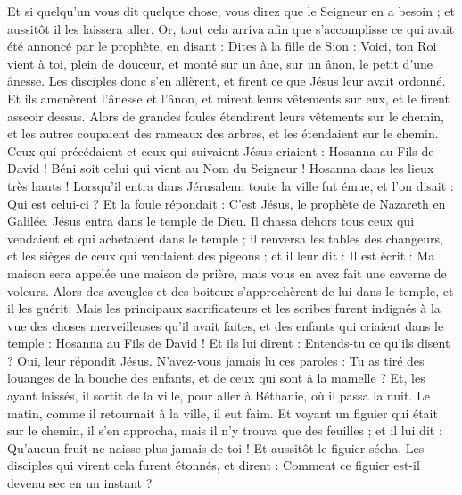 \begin{multicols}{2}
Et si quelqu'un vous dit quelque chose, vous direz que le Seigneur en a besoin ; et aussitôt il les laissera aller.
Or, tout cela arriva afin que s’accomplisse ce qui avait été annoncé par le prophète, en disant :
Dites à la fille de Sion : Voici, ton Roi vient à toi, plein de douceur, et monté sur un âne, sur un ânon, le petit d'une ânesse{}.
Les disciples donc s'en allèrent, et firent ce que Jésus leur avait ordonné.
Et ils amenèrent l'ânesse et l'ânon, et mirent leurs vêtements sur eux, et le firent asseoir dessus.
Alors de grandes foules étendirent leurs vêtements sur le chemin, et les autres coupaient des rameaux des arbres, et les étendaient sur le chemin.
Ceux qui précédaient et ceux qui suivaient Jésus criaient : Hosanna au Fils de David ! Béni soit celui qui vient au Nom du Seigneur ! Hosanna dans les lieux très hauts !
Lorsqu’il entra dans Jérusalem, toute la ville fut émue, et l’on disait : Qui est celui-ci ?
Et la foule répondait : C’est Jésus, le prophète de Nazareth en Galilée.
Jésus entra dans le temple de Dieu. Il chassa dehors tous ceux qui vendaient et qui achetaient dans le temple ; il renversa les tables des changeurs, et les sièges de ceux qui vendaient des pigeons ;
et il leur dit : Il est écrit : Ma maison sera appelée une maison de prière, mais vous en avez fait une caverne de voleurs{}.
Alors des aveugles et des boiteux s’approchèrent de lui dans le temple, et il les guérit.
Mais les principaux sacrificateurs et les scribes furent indignés à la vue des choses merveilleuses qu'il avait faites, et des enfants qui criaient dans le temple : Hosanna au Fils de David !
Et ils lui dirent : Entends-tu ce qu’ils disent ? Oui, leur répondit Jésus. N'avez-vous jamais lu ces paroles : Tu as tiré des louanges de la bouche des enfants, et de ceux qui sont à la mamelle{} ?
Et, les ayant laissés, il sortit de la ville, pour aller à Béthanie, où il passa la nuit.
Le matin, comme il retournait à la ville, il eut faim.
Et voyant un figuier qui était sur le chemin, il s'en approcha, mais il n'y trouva que des feuilles ; et il lui dit : Qu'aucun fruit ne naisse plus jamais de toi ! Et aussitôt le figuier sécha.
Les disciples qui virent cela furent étonnés, et dirent : Comment ce figuier est-il devenu sec en un instant ?

\end{multicols}
